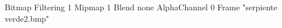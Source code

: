 {Bitmap
	{Filtering 1}
	{Mipmap 1}
	{Blend none}
	{AlphaChannel 0}
	{Frame "serpiente verde2.bmp"}
}
